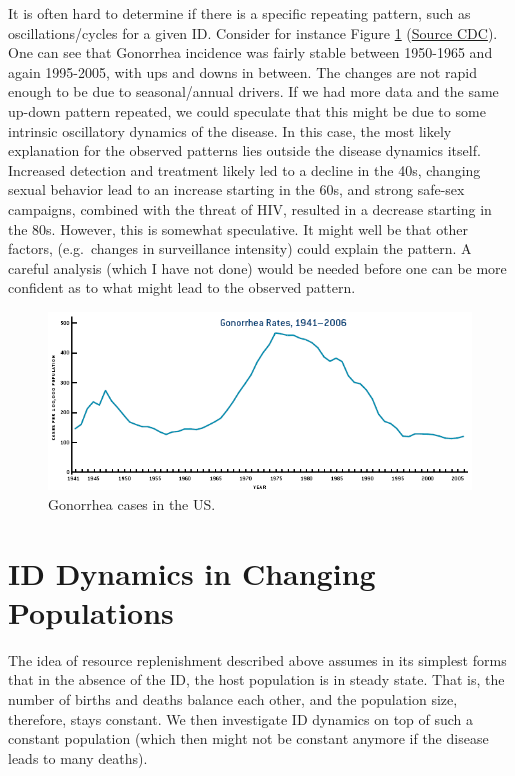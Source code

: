 \documentclass[]{book}
\theoremstyle{definition}
\theoremstyle{definition}
\theoremstyle{definition}
\theoremstyle{remark}
\begin{document}
It is often hard to determine if there is a specific repeating pattern,
such as oscillations/cycles for a given ID. Consider for instance Figure
\ref{fig:gonorrheapattern}
(\href{http://www.cdc.gov/STD/stats06/images/trends-img-2.gif}{Source
CDC}). One can see that Gonorrhea incidence was fairly stable between
1950-1965 and again 1995-2005, with ups and downs in between. The
changes are not rapid enough to be due to seasonal/annual drivers. If we
had more data and the same up-down pattern repeated, we could speculate
that this might be due to some intrinsic oscillatory dynamics of the
disease. In this case, the most likely explanation for the observed
patterns lies outside the disease dynamics itself. Increased detection
and treatment likely led to a decline in the 40s, changing sexual
behavior lead to an increase starting in the 60s, and strong safe-sex
campaigns, combined with the threat of HIV, resulted in a decrease
starting in the 80s. However, this is somewhat speculative. It might
well be that other factors, (e.g.~changes in surveillance intensity)
could explain the pattern. A careful analysis (which I have not done)
would be needed before one can be more confident as to what might lead
to the observed pattern.

\begin{figure}
\centering
\includegraphics{./images/gonorrhea.png}
\caption{\label{fig:gonorrheapattern}Gonorrhea cases in the US.}
\end{figure}

\section{ID Dynamics in Changing
Populations}\label{id-dynamics-in-changing-populations}

The idea of resource replenishment described above assumes in its
simplest forms that in the absence of the ID, the host population is in
steady state. That is, the number of births and deaths balance each
other, and the population size, therefore, stays constant. We then
investigate ID dynamics on top of such a constant population (which then
might not be constant anymore if the disease leads to many deaths).
\end{document}
